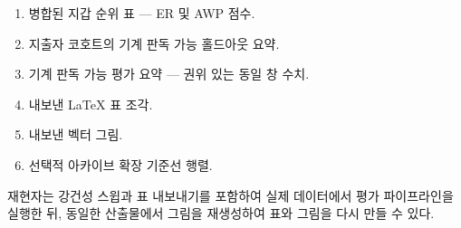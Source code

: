 
\begin{enumerate}
\item 병합된 지갑 순위 표 --- ER 및 AWP 점수.
\item 지출자 코호트의 기계 판독 가능 홀드아웃 요약.
\item 기계 판독 가능 평가 요약 --- 권위 있는 동일 창 수치.
\item 내보낸 LaTeX 표 조각.
\item 내보낸 벡터 그림.
\item 선택적 아카이브 확장 기준선 행렬.
\end{enumerate}

재현자는 강건성 스윕과 표 내보내기를 포함하여 실제 데이터에서 평가 파이프라인을 실행한 뒤, 동일한 산출물에서 그림을 재생성하여 표와 그림을 다시 만들 수 있다.
